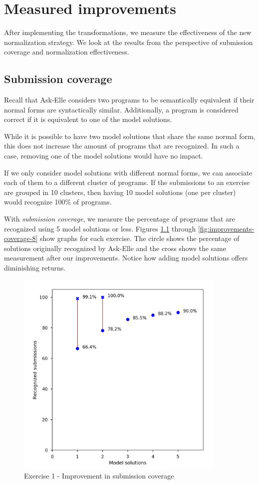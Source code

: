 \chapter{Measured improvements}
\label{sec:improvements}

After implementing the transformations, we measure the effectiveness of the new normalization strategy. We look at the results from the perspective of submission coverage and normalization effectiveness.

\section{Submission coverage}

Recall that Ask-Elle considers two programs to be semantically equivalent if their normal forms are syntactically similar. Additionally, a program is considered correct if it is equivalent to one of the model solutions.

While it is possible to have two model solutions that share the same normal form, this does not increase the amount of programs that are recognized. In such a case, removing one of the model solutions would have no impact.

If we only consider model solutions with different normal forms, we can associate each of them to a different cluster of programs. If the submissions to an exercise are grouped in 10 clusters, then having 10 model solutions (one per cluster) would recognize 100\% of programs.

With \emph{submission coverage}, we measure the percentage of programs that are recognized using 5 model solutions or less. Figures \ref{fig:improvements-coverage-1} through \ref{fig:improvements-coverage-8} show graphs for each exercise. The circle shows the percentage of solutions originally recognized by Ask-Elle and the cross shows the same measurement after our improvements. Notice how adding model solutions offers diminishing returns.

\begin{figure}
\centering
\includegraphics[height=10cm]{graphs/coverage-1.png}
\caption{Exercise 1 - Improvement in submission coverage}
\label{fig:improvements-coverage-1}
\end{figure}

